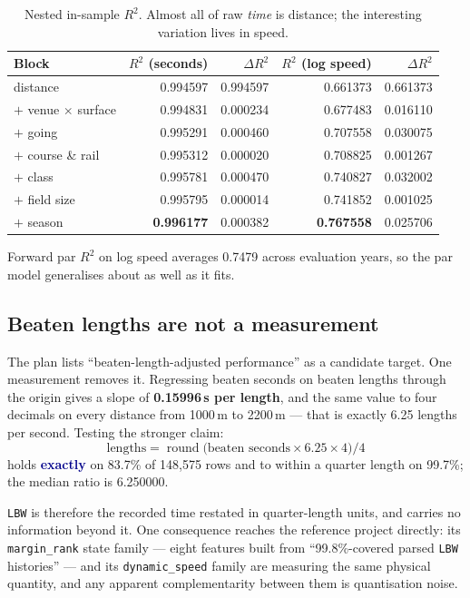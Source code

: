 \documentclass[11pt,a4paper]{article}
\newcommand{\good}[1]{\textcolor{darkblue}{\textbf{#1}}}
\begin{document}
\begin{table}[htbp]\centering\small
\caption{Nested in-sample $R^2$. Almost all of raw \emph{time} is distance; the
interesting variation lives in speed.}
\begin{tabular}{lrrrr}
\toprule
Block & $R^2$ (seconds) & $\Delta R^2$ & $R^2$ (log speed) & $\Delta R^2$\\
\midrule
distance & 0.994597 & 0.994597 & 0.661373 & 0.661373\\
$+$ venue $\times$ surface & 0.994831 & 0.000234 & 0.677483 & 0.016110\\
$+$ going & 0.995291 & 0.000460 & 0.707558 & 0.030075\\
$+$ course \& rail & 0.995312 & 0.000020 & 0.708825 & 0.001267\\
$+$ class & 0.995781 & 0.000470 & 0.740827 & 0.032002\\
$+$ field size & 0.995795 & 0.000014 & 0.741852 & 0.001025\\
$+$ season & \textbf{0.996177} & 0.000382 & \textbf{0.767558} & 0.025706\\
\bottomrule
\end{tabular}
\end{table}

Forward par $R^2$ on log speed averages 0.7479 across evaluation years, so the par
model generalises about as well as it fits.

\subsection{Beaten lengths are not a measurement}

The plan lists ``beaten-length-adjusted performance'' as a candidate target. One
measurement removes it. Regressing beaten seconds on beaten lengths through the
origin gives a slope of \textbf{0.15996\,s per length}, and the same value to four
decimals on every distance from 1000\,m to 2200\,m --- that is exactly 6.25
lengths per second. Testing the stronger claim:
\[
\text{lengths} = \operatorname{round}\!\big(\text{beaten seconds}\times 6.25\times 4\big)/4
\]
holds \good{exactly} on 83.7\% of 148{,}575 rows and to within a quarter length on
99.7\%; the median ratio is 6.250000.

\texttt{LBW} is therefore the recorded time restated in quarter-length units, and
carries no information beyond it. One consequence reaches the reference project
directly: its \texttt{margin\_rank} state family --- eight features built from
``99.8\%-covered parsed \texttt{LBW} histories'' --- and its
\texttt{dynamic\_speed} family are measuring the same physical quantity, and any
apparent complementarity between them is quantisation noise.
\end{document}
